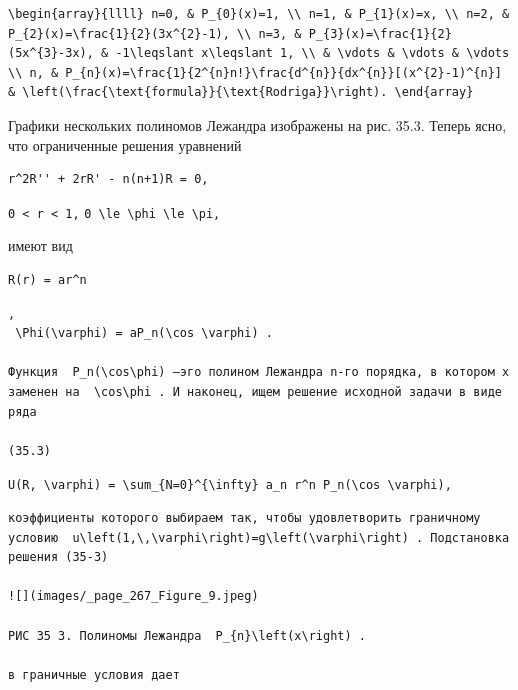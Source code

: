 \documentclass[
  ukrainian,
]{article}
\begin{document}
\begin{verbatim}
\begin{array}{llll} n=0, & P_{0}(x)=1, \\ n=1, & P_{1}(x)=x, \\ n=2, & P_{2}(x)=\frac{1}{2}(3x^{2}-1), \\ n=3, & P_{3}(x)=\frac{1}{2}(5x^{3}-3x), & -1\leqslant x\leqslant 1, \\ & \vdots & \vdots & \vdots \\ n, & P_{n}(x)=\frac{1}{2^{n}n!}\frac{d^{n}}{dx^{n}}[(x^{2}-1)^{n}] & \left(\frac{\text{formula}}{\text{Rodriga}}\right). \end{array}
\end{verbatim}

Графики нескольких полиномов Лежандра изображены на рис. 35.3. Теперь
ясно, что ограниченные решения уравнений

\begin{verbatim}
r^2R'' + 2rR' - n(n+1)R = 0,
\end{verbatim}

\texttt{0\ \textless{}\ r\ \textless{}\ 1,}
\texttt{0\ \textbackslash{}le\ \textbackslash{}phi\ \textbackslash{}le\ \textbackslash{}pi,}

имеют вид

\begin{verbatim}
R(r) = ar^n
\end{verbatim}

\begin{verbatim}
,  
 \Phi(\varphi) = aP_n(\cos \varphi) .

Функция  P_n(\cos\phi) —эго полином Лежандра n-го порядка, в котором x заменен на  \cos\phi . И наконец, ищем решение исходной задачи в виде ряда

(35.3)
\end{verbatim}

\texttt{U(R,\ \textbackslash{}varphi)\ =\ \textbackslash{}sum\_\{N=0\}\^{}\{\textbackslash{}infty\}\ a\_n\ r\^{}n\ P\_n(\textbackslash{}cos\ \textbackslash{}varphi),}

\begin{verbatim}
коэффициенты которого выбираем так, чтобы удовлетворить граничному условию  u\left(1,\,\varphi\right)=g\left(\varphi\right) . Подстановка решения (35-3)

![](images/_page_267_Figure_9.jpeg)

РИС 35 3. Полиномы Лежандра  P_{n}\left(x\right) .

в граничные условия дает
\end{verbatim}
\end{document}
